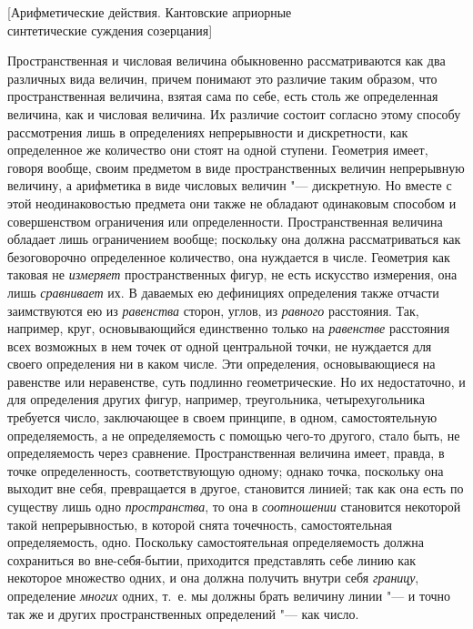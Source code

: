 %
{[Арифметические действия. Кантовские априорные\\
синтетические суждения созерцания]}

Пространственная и числовая величина обыкновенно рассматриваются как два
различных вида величин, причем понимают это различие таким образом, что
пространственная величина, взятая сама по себе, есть столь же определенная
величина, как и числовая величина. Их различие состоит согласно этому способу
рассмотрения лишь в определениях непрерывности и дискретности, как определенное
же количество они стоят на одной ступени. Геометрия имеет, говоря вообще, своим
предметом в виде пространственных величин непрерывную величину, а арифметика в
виде числовых величин "--- дискретную. Но вместе с этой неодинаковостью
предмета они также не обладают одинаковым способом и совершенством ограничения
или определенности. Пространственная величина обладает лишь ограничением
вообще; поскольку она должна рассматриваться как безоговорочно определенное
количество, она нуждается в числе. Геометрия как таковая не {\em измеряет}
пространственных фигур, не есть искусство измерения, она лишь {\em сравнивает}
их. В даваемых ею дефинициях определения также отчасти заимствуются ею из
{\em равенства} сторон, углов, из {\em равного} расстояния. Так, например,
круг, основывающийся единственно только на {\em равенстве} расстояния всех
возможных в нем точек от одной центральной точки, не нуждается для своего
определения ни в каком числе. Эти определения, основывающиеся на равенстве или
неравенстве, суть подлинно геометрические. Но их недостаточно, и для
определения других фигур, например, треугольника, четырехугольника требуется
число, заключающее в своем принципе, в одном, самостоятельную определяемость,
а не определяемость с помощью чего-то другого, стало быть, не определяемость
через сравнение. Пространственная величина имеет, правда, в точке
определенность, соответствующую одному; однако точка, поскольку она выходит вне
себя, превращается в другое, становится линией; так как она есть по существу
лишь одно {\em пространства}, то она в {\em соотношении} становится некоторой
такой непрерывностью, в которой снята точечность, самостоятельная
определяемость, одно. Поскольку самостоятельная определяемость должна
сохраниться во вне-себя-бытии, приходится представлять себе линию как некоторое
множество одних, и она должна получить внутри себя {\em границу}, определение
{\em многих} одних, т.~е. мы должны брать величину линии "--- и точно так же и
других пространственных определений "--- как число.

